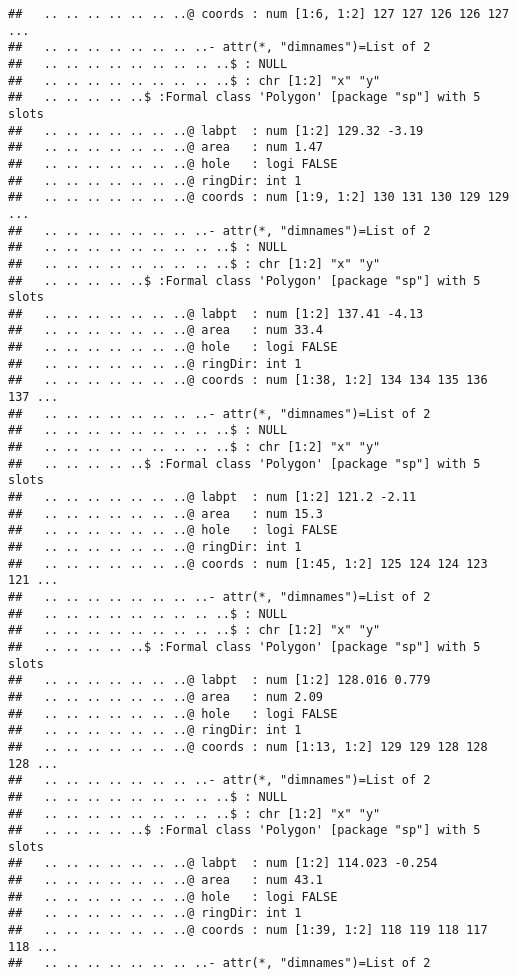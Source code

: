 \documentclass[]{article}
\begin{document}
\begin{verbatim}
##   .. .. .. .. .. .. ..@ coords : num [1:6, 1:2] 127 127 126 126 127 ...
##   .. .. .. .. .. .. .. ..- attr(*, "dimnames")=List of 2
##   .. .. .. .. .. .. .. .. ..$ : NULL
##   .. .. .. .. .. .. .. .. ..$ : chr [1:2] "x" "y"
##   .. .. .. .. ..$ :Formal class 'Polygon' [package "sp"] with 5 slots
##   .. .. .. .. .. .. ..@ labpt  : num [1:2] 129.32 -3.19
##   .. .. .. .. .. .. ..@ area   : num 1.47
##   .. .. .. .. .. .. ..@ hole   : logi FALSE
##   .. .. .. .. .. .. ..@ ringDir: int 1
##   .. .. .. .. .. .. ..@ coords : num [1:9, 1:2] 130 131 130 129 129 ...
##   .. .. .. .. .. .. .. ..- attr(*, "dimnames")=List of 2
##   .. .. .. .. .. .. .. .. ..$ : NULL
##   .. .. .. .. .. .. .. .. ..$ : chr [1:2] "x" "y"
##   .. .. .. .. ..$ :Formal class 'Polygon' [package "sp"] with 5 slots
##   .. .. .. .. .. .. ..@ labpt  : num [1:2] 137.41 -4.13
##   .. .. .. .. .. .. ..@ area   : num 33.4
##   .. .. .. .. .. .. ..@ hole   : logi FALSE
##   .. .. .. .. .. .. ..@ ringDir: int 1
##   .. .. .. .. .. .. ..@ coords : num [1:38, 1:2] 134 134 135 136 137 ...
##   .. .. .. .. .. .. .. ..- attr(*, "dimnames")=List of 2
##   .. .. .. .. .. .. .. .. ..$ : NULL
##   .. .. .. .. .. .. .. .. ..$ : chr [1:2] "x" "y"
##   .. .. .. .. ..$ :Formal class 'Polygon' [package "sp"] with 5 slots
##   .. .. .. .. .. .. ..@ labpt  : num [1:2] 121.2 -2.11
##   .. .. .. .. .. .. ..@ area   : num 15.3
##   .. .. .. .. .. .. ..@ hole   : logi FALSE
##   .. .. .. .. .. .. ..@ ringDir: int 1
##   .. .. .. .. .. .. ..@ coords : num [1:45, 1:2] 125 124 124 123 121 ...
##   .. .. .. .. .. .. .. ..- attr(*, "dimnames")=List of 2
##   .. .. .. .. .. .. .. .. ..$ : NULL
##   .. .. .. .. .. .. .. .. ..$ : chr [1:2] "x" "y"
##   .. .. .. .. ..$ :Formal class 'Polygon' [package "sp"] with 5 slots
##   .. .. .. .. .. .. ..@ labpt  : num [1:2] 128.016 0.779
##   .. .. .. .. .. .. ..@ area   : num 2.09
##   .. .. .. .. .. .. ..@ hole   : logi FALSE
##   .. .. .. .. .. .. ..@ ringDir: int 1
##   .. .. .. .. .. .. ..@ coords : num [1:13, 1:2] 129 129 128 128 128 ...
##   .. .. .. .. .. .. .. ..- attr(*, "dimnames")=List of 2
##   .. .. .. .. .. .. .. .. ..$ : NULL
##   .. .. .. .. .. .. .. .. ..$ : chr [1:2] "x" "y"
##   .. .. .. .. ..$ :Formal class 'Polygon' [package "sp"] with 5 slots
##   .. .. .. .. .. .. ..@ labpt  : num [1:2] 114.023 -0.254
##   .. .. .. .. .. .. ..@ area   : num 43.1
##   .. .. .. .. .. .. ..@ hole   : logi FALSE
##   .. .. .. .. .. .. ..@ ringDir: int 1
##   .. .. .. .. .. .. ..@ coords : num [1:39, 1:2] 118 119 118 117 118 ...
##   .. .. .. .. .. .. .. ..- attr(*, "dimnames")=List of 2

\end{verbatim}
\end{document}
